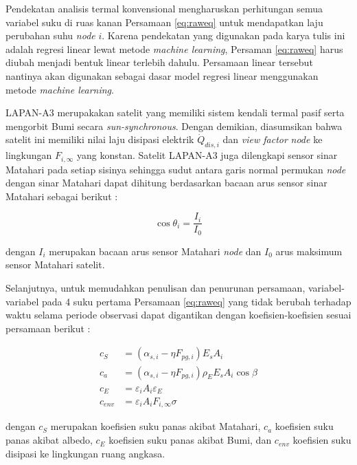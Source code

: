 Pendekatan analisis termal konvensional mengharuskan perhitungan semua variabel
suku di ruas kanan Persamaan \ref{eq:raweq} untuk mendapatkan laju perubahan
suhu \textit{node} $i$. Karena pendekatan yang digunakan pada karya tulis ini adalah
regresi linear lewat metode \textit{machine learning}, Persaman \ref{eq:raweq} harus
diubah menjadi bentuk linear terlebih dahulu. Persamaan linear tersebut
nantinya akan digunakan sebagai dasar model regresi linear menggunakan metode
\textit{machine learning}.

LAPAN-A3 merupakakan satelit yang memiliki sistem kendali termal pasif serta
mengorbit Bumi secara \textit{sun-synchronous}. Dengan demikian, diasumsikan
bahwa satelit ini memiliki nilai laju disipasi elektrik $\dot{Q}_{dis,i}$ dan
\textit{view factor} \textit{node} ke lingkungan $F_{i,\infty}$ yang konstan. Satelit
LAPAN-A3 juga dilengkapi sensor sinar Matahari pada setiap sisinya
\cite{hasbi2013} sehingga sudut antara garis normal permukan \textit{node} dengan sinar
Matahari dapat dihitung berdasarkan bacaan arus sensor sinar Matahari sebagai
berikut \cite{zahran2009}:

\begin{equation}
\label{eq:current}
	\cos{\theta_i} = \frac{I_i}{I_0}
\end{equation}

dengan $I_i$ merupakan bacaan arus sensor Matahari \textit{node} dan $I_0$ arus
maksimum sensor Matahari satelit.

Selanjutnya, untuk memudahkan penulisan dan penurunan persamaan,
variabel-variabel pada 4 suku pertama Persamaan \ref{eq:raweq} yang tidak
berubah terhadap waktu selama periode observasi dapat digantikan dengan
koefisien-koefisien sesuai persamaan berikut :

\begin{equation}
\label{eq:short}
\begin{split}
	c_{S} &= \left(\alpha_{s,i} - \eta F_{pg,i}\right) E_s A_i \\
	c_{a} &= \left(\alpha_{s,i} - \eta F_{pg,i}\right)\rho_{E} E_s A_i \cos{\beta} \\
	c_{E} &= \varepsilon_i A_i \varepsilon_E \\
	c_{env} &= \varepsilon_i A_i F_{i,\infty} \sigma
\end{split}
\end{equation}

dengan $c_{S}$ merupakan koefisien suku panas akibat Matahari, $c_{a}$
koefisien suku panas akibat albedo, $c_{E}$ koefisien suku panas akibat Bumi,
dan $c_{env}$ koefisien suku disipasi ke lingkungan ruang angkasa.

